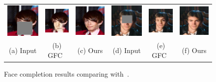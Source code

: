 \begin{figure}[h!]
\begin{tabular}{cccccc}
\includegraphics[width=.16\textwidth]{figures/face/000197_input_image.png}&
\includegraphics[width=.16\textwidth]{figures/face/res3/res.jpg}&
\includegraphics[width=.16\textwidth]{figures/face/000197_synthesized_image.png}&
\includegraphics[width=.16\textwidth]{figures/face/000200_input_image.png}&
\includegraphics[width=.16\textwidth]{figures/face/res4/res.jpg}&
\includegraphics[width=.16\textwidth]{figures/face/000200_synthesized_image.png}\\
(a) Input & (b) GFC~\cite{li2017generative} & (c) Ours & (d) Input & (e) GFC~\cite{li2017generative} & (f) Ours \\
\end{tabular}
\caption{Face completion results comparing with~\cite{li2017generative}.}
\label{fig:face}
\vspace{-5pt}
\end{figure}  


